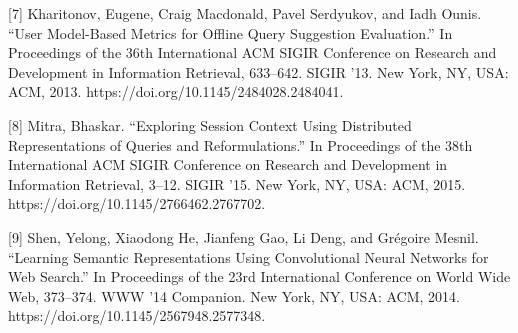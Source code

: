 \documentclass[12pt]{article} %
\begin{document}
{[7] Kharitonov, Eugene, Craig Macdonald, Pavel Serdyukov, and Iadh Ounis. “User Model-Based Metrics for Offline Query Suggestion Evaluation.” In Proceedings of the 36th International ACM SIGIR Conference on Research and Development in Information Retrieval, 633–642. SIGIR ’13. New York, NY, USA: ACM, 2013. https://doi.org/10.1145/2484028.2484041.

[8] Mitra, Bhaskar. “Exploring Session Context Using Distributed Representations of Queries and Reformulations.” In Proceedings of the 38th International ACM SIGIR Conference on Research and Development in Information Retrieval, 3–12. SIGIR ’15. New York, NY, USA: ACM, 2015. https://doi.org/10.1145/2766462.2767702.

[9] Shen, Yelong, Xiaodong He, Jianfeng Gao, Li Deng, and Grégoire Mesnil. “Learning Semantic Representations Using Convolutional Neural Networks for Web Search.” In Proceedings of the 23rd International Conference on World Wide Web, 373–374. WWW ’14 Companion. New York, NY, USA: ACM, 2014. https://doi.org/10.1145/2567948.2577348.

} 
\end{document}

